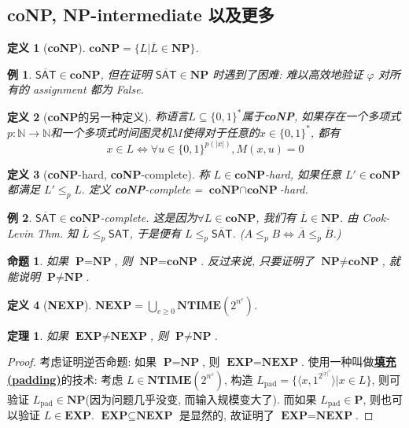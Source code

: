 \documentclass[8pt]{article}
\theoremstyle{compact}
\newtheorem{theorem}{定理}[section]
\newtheorem{definition}{定义}[section]
\newtheorem{proposition}{命题}[section]
\newtheorem{example}{例}[section]
\def\obj#1{\textbf{\uline{#1}}}
\def\le{\leqslant}
\def\ge{\geqslant}
\def\NTIME{\textbf{NTIME}}
\def\P{\textbf{P}}
\def\NP{\textbf{NP}}
\def\coNP{\textbf{coNP}}
\def\EXP{\textbf{EXP}}
\def\NEXP{\textbf{NEXP}}
\begin{document}
\subsection{\coNP, \NP-intermediate 以及更多}
\begin{definition}[\coNP]
	$\coNP = \{L | \overline{L} \in \NP\}$.
\end{definition}
\begin{example}
	$\overline{\textsf{SAT}} \in \coNP$, 但在证明 $\overline{\textsf{SAT}} \in \NP$ 时遇到了困难: 难以高效地验证 $\varphi$ 对所有的 assignment 都为 False.
\end{example}
\begin{definition}[\coNP 的另一种定义]
	称语言$L \subseteq \{0, 1\}^*$属于\coNP, 如果存在一个多项式$p: \mathbb N \to \mathbb N$和一个多项式时间图灵机$M$使得对于任意的$x \in \{0, 1\}^*$, 都有
	$$x \in L \Leftrightarrow \forall u \in \{0, 1\}^{p(|x|)}, M(x, u) = 0$$
\end{definition}
\begin{definition}[\coNP-hard, \coNP-complete]
	称 $L \in \coNP$-hard, 如果任意 $L' \in \coNP$ 都满足 $L' \le_p L.$ 定义 \coNP-complete = $\coNP \cap \coNP$-hard.
\end{definition}
\begin{example}
	$\overline{\textsf{SAT}} \in \coNP$-complete. 这是因为$\forall L \in \coNP$, 我们有 $\overline L \in \NP$. 由 Cook-Levin Thm. 知 $\overline L \le_p \textsf{SAT}$, 于是便有 $L \le_p \overline{\textsf{SAT}}$. ($A \le_p B \Leftrightarrow \overline A \le_p \overline B$.)
\end{example}
\begin{proposition}
	如果 $\P = \NP$, 则 $\NP = \coNP$. 反过来说, 只要证明了 $\NP \neq \coNP$, 就能说明 $\P \neq \NP$.
\end{proposition}
\begin{definition}[\NEXP]
	$\NEXP = \bigcup_{c \ge 0}\NTIME(2^{n^c})$.
\end{definition}
\begin{theorem}
	如果 $\EXP \neq \NEXP$, 则 $\P \neq \NP$.
\end{theorem}
\begin{proof}
	考虑证明逆否命题: 如果 $\P = \NP$, 则 $\EXP = \NEXP$. 使用一种叫做\obj{填充(padding)}的技术: 考虑 $L \in \NTIME(2^{n^c})$, 构造 $L_{\text{pad}} = \{\langle x, 1^{2^{|x|^c}}\rangle | x \in L\}$, 则可验证 $L_{\text{pad}} \in \NP$(因为问题几乎没变, 而输入规模变大了). 而如果 $L_{\text{pad}} \in \P$, 则也可以验证 $L \in \EXP$. $\EXP \subseteq \NEXP$ 是显然的, 故证明了 $\EXP = \NEXP$.
\end{proof}
\end{document}
